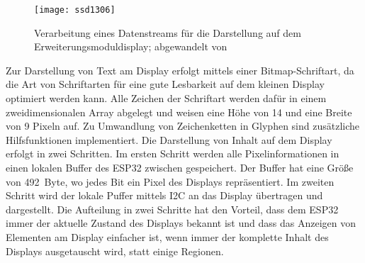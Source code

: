 \begin{figure}[h]
    \centering
    \texttt{[image: ssd1306]}
    \caption{Verarbeitung eines Datenstreams für die Darstellung auf dem Erweiterungsmoduldisplay; abgewandelt von \cite[S.~37]{ssd1306}}
    \label{fig:ssd1306PixelControl}
\end{figure}

Zur Darstellung von Text am Display erfolgt mittels einer Bitmap-Schriftart, da die Art von Schriftarten für eine gute Lesbarkeit auf dem kleinen Display optimiert werden kann. Alle Zeichen der Schriftart werden dafür in einem zweidimensionalen Array abgelegt und weisen eine Höhe von 14 und eine Breite von 9 Pixeln auf. Zu Umwandlung von Zeichenketten in Glyphen sind zusätzliche Hilfsfunktionen implementiert. Die Darstellung von Inhalt auf dem Display erfolgt in zwei Schritten. Im ersten Schritt werden alle Pixelinformationen in einen lokalen Buffer des ESP32 zwischen gespeichert. Der Buffer hat eine Größe von 492~Byte, wo jedes Bit ein Pixel des Displays repräsentiert. Im zweiten Schritt wird der lokale Puffer mittels \ac{I2C} an das Display übertragen und dargestellt. Die Aufteilung in zwei Schritte hat den Vorteil, dass dem ESP32 immer der aktuelle Zustand des Displays bekannt ist und dass das Anzeigen von Elementen am Display einfacher ist, wenn immer der komplette Inhalt des Displays ausgetauscht wird, statt einige Regionen.


